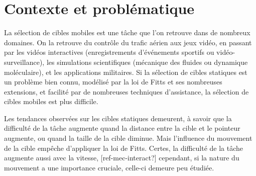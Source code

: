 



\section*{Contexte et problématique}
    La sélection de cibles mobiles est une tâche que l'on retrouve dans de nombreux domaines. On la retrouve du contrôle du trafic aérien aux jeux vidéo, en passant par les vidéos interactives (enregistrements d'événements sportifs ou vidéo-surveillance), les simulations scientifiques (mécanique des fluides ou dynamique moléculaire), et les applications militaires. Si la sélection de cibles statiques est un problème bien connu, modélisé par la loi de Fitts et ses nombreuses extensions, et facilité par de nombreuses techniques d'assistance, la sélection de cibles mobiles est plus difficile.
    
    Les tendances observées sur les cibles statiques demeurent, à savoir que la difficulté de la tâche augmente quand la distance entre la cible et le pointeur augmente, ou quand la taille de la cible diminue. Mais l'influence du mouvement de la cible empêche d'appliquer la loi de Fitts. Certes, la difficulté de la tâche augmente aussi avec la vitesse, [ref-mec-interact?] cependant, si la nature du mouvement a une importance cruciale, celle-ci demeure peu étudiée.
    
    
    
